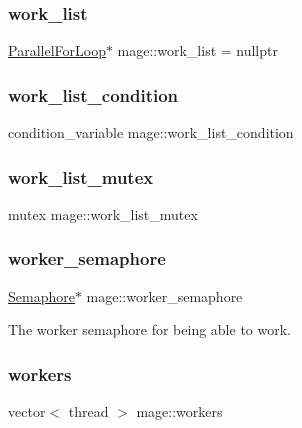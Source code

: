 \subsubsection{\texorpdfstring{work\+\_\+list}{work\_list}}
{\footnotesize\ttfamily \hyperlink{classmage_1_1_parallel_for_loop}{Parallel\+For\+Loop}$\ast$ mage\+::work\+\_\+list = nullptr\hspace{0.3cm}{\ttfamily [static]}}

\hypertarget{namespacemage_a06c363811ca265ff89fbbe2b80e1e3d2}{}\label{namespacemage_a06c363811ca265ff89fbbe2b80e1e3d2} 
\subsubsection{\texorpdfstring{work\+\_\+list\+\_\+condition}{work\_list\_condition}}
{\footnotesize\ttfamily condition\+\_\+variable mage\+::work\+\_\+list\+\_\+condition\hspace{0.3cm}{\ttfamily [static]}}

\hypertarget{namespacemage_a7e67d8a6b0029abe8f1480807f18b16a}{}\label{namespacemage_a7e67d8a6b0029abe8f1480807f18b16a} 
\subsubsection{\texorpdfstring{work\+\_\+list\+\_\+mutex}{work\_list\_mutex}}
{\footnotesize\ttfamily mutex mage\+::work\+\_\+list\+\_\+mutex\hspace{0.3cm}{\ttfamily [static]}}

\hypertarget{namespacemage_a17c3448f9fba7521d188d30bdfb77e33}{}\label{namespacemage_a17c3448f9fba7521d188d30bdfb77e33} 
\subsubsection{\texorpdfstring{worker\+\_\+semaphore}{worker\_semaphore}}
{\footnotesize\ttfamily \hyperlink{classmage_1_1_semaphore}{Semaphore}$\ast$ mage\+::worker\+\_\+semaphore\hspace{0.3cm}{\ttfamily [static]}}

The worker semaphore for being able to work. \hypertarget{namespacemage_ad2f58114b13692a9af3222fcd3b2ec2e}{}\label{namespacemage_ad2f58114b13692a9af3222fcd3b2ec2e} 
\subsubsection{\texorpdfstring{workers}{workers}}
{\footnotesize\ttfamily vector$<$ thread $>$ mage\+::workers\hspace{0.3cm}{\ttfamily [static]}}


